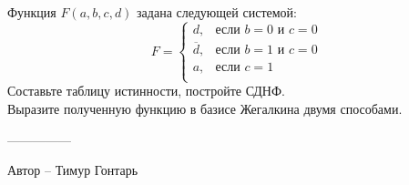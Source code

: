 \question
Функция $F(a, b, c, d)$ задана следующей системой:
\begin{equation*}
    F =
    \begin{cases}
        d, &\text{если $b=0$ и $c=0$}\\
        \overline{d}, &\text{если $b=1$ и $c=0$}\\
        a, &\text{если $c=1$}\\
    \end{cases}
\end{equation*}
Составьте таблицу истинности, постройте СДНФ.
\\
Выразите полученную функцию в базисе Жегалкина двумя способами.

---------------

Автор -- Тимур Гонтарь